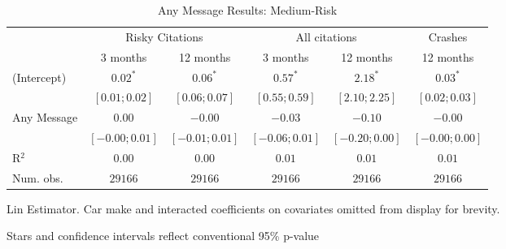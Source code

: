 
\begin{table}
\caption{Any Message Results: Medium-Risk}
\begin{center}
\begin{threeparttable}
\begin{tabular}{l c c c c c}
\hline
 & \multicolumn{2}{c}{Risky Citations} & \multicolumn{2}{c}{All citations} & \multicolumn{1}{c}{Crashes} \\
\cline{2-3} \cline{4-5} \cline{6-6}
 & 3 months & 12 months & 3 months & 12 months & 12 months \\
\hline
(Intercept) & $0.02^{*}$       & $0.06^{*}$       & $0.57^{*}$       & $2.18^{*}$       & $0.03^{*}$       \\
            & $ [ 0.01; 0.02]$ & $ [ 0.06; 0.07]$ & $ [ 0.55; 0.59]$ & $ [ 2.10; 2.25]$ & $ [ 0.02; 0.03]$ \\
Any Message & $0.00$           & $-0.00$          & $-0.03$          & $-0.10$          & $-0.00$          \\
            & $ [-0.00; 0.01]$ & $ [-0.01; 0.01]$ & $ [-0.06; 0.01]$ & $ [-0.20; 0.00]$ & $ [-0.00; 0.00]$ \\
\hline
R$^2$       & $0.00$           & $0.00$           & $0.01$           & $0.01$           & $0.01$           \\
Num. obs.   & $29166$          & $29166$          & $29166$          & $29166$          & $29166$          \\
\hline
\end{tabular}
\begin{tablenotes}[flushleft]
\scriptsize{\item Lin Estimator. Car make and interacted coefficients on covariates omitted from display for brevity.
                             \item Stars and confidence intervals reflect conventional 95\% p-value}
\end{tablenotes}
\end{threeparttable}
\label{table:coefficients}
\end{center}
\end{table}
